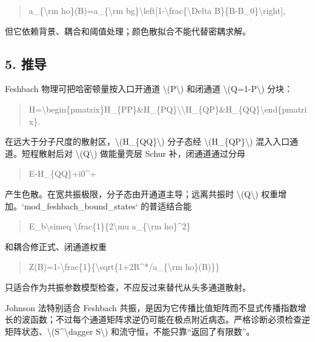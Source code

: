 \documentclass[UTF8,openany,11pt,fontset=fandol]{ctexbook}
\begin{document}
\begin{quote}
a\_\{\textbackslash rm ho\}(B)=a\_\{\textbackslash rm
bg\}\textbackslash left{[}1-\textbackslash frac\{\textbackslash Delta
B\}\{B-B\_0\}\textbackslash right{]},
\end{quote}

但它依赖背景、耦合和阈值处理；颜色散拟合不能代替密耦求解。

\subsection{\texorpdfstring{\textbf{5.
推导}}{5. 推导}}\label{ux63a8ux5bfc-2}

Feshbach 物理可把哈密顿量按入口开通道 \textbackslash(P\textbackslash)
和闭通道 \textbackslash(Q=1-P\textbackslash) 分块：

\begin{quote}
H=\textbackslash begin\{pmatrix\}H\_\{PP\}\&H\_\{PQ\}\textbackslash\textbackslash H\_\{QP\}\&H\_\{QQ\}\textbackslash end\{pmatrix\}.
\end{quote}

在远大于分子尺度的散射区，\textbackslash(H\_\{QQ\}\textbackslash)
分子态经 \textbackslash(H\_\{QP\}\textbackslash)
混入入口通道。短程散射后对 \textbackslash(Q\textbackslash) 做能量壳层
Schur 补，闭通道通过分母

\begin{quote}
E-H\_\{QQ\}+i0\^{}+
\end{quote}

产生色散。在宽共振极限，分子态由开通道主导；远离共振时
\textbackslash(Q\textbackslash) 权重增加。`mod\_feshbach\_bound\_states`
的普适结合能

\begin{quote}
E\_b\textbackslash simeq \textbackslash frac\{1\}\{2\textbackslash mu
a\_\{\textbackslash rm ho\}\^{}2\}
\end{quote}

和耦合修正式、闭通道权重

\begin{quote}
Z(B)=1-\textbackslash frac\{1\}\{\textbackslash sqrt\{1+2R\^{}*/a\_\{\textbackslash rm
ho\}(B)\}\}
\end{quote}

只适合作为共振参数模型检查，不应反过来替代从头多通道散射。

Johnson 法特别适合 Feshbach
共振，是因为它传播比值矩阵而不显式传播指数增长的波函数；不过每个通道矩阵求逆仍可能在极点附近病态。严格诊断必须检查逆矩阵状态、\textbackslash(S\^{}\textbackslash dagger
S\textbackslash) 和流守恒，不能只靠``返回了有限数''。
\end{document}
